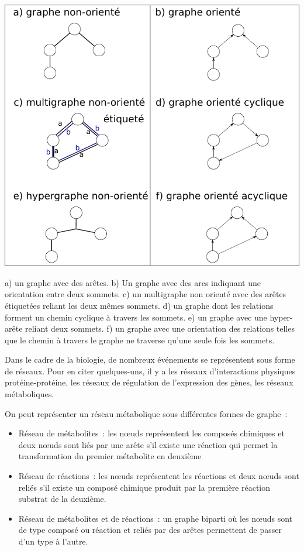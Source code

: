 \begin{refsegment}
    
    \begin{shadedfigure}[H]
    	\centering
    	\includegraphics[width=\textwidth]{img/graph.pdf}
    	\caption{a) un graphe  avec des arêtes. b) Un graphe avec des arcs indiquant une orientation entre deux sommets. c) un multigraphe non orienté avec des arêtes étiquetées reliant les deux mêmes sommets. d) un graphe dont les relations forment un chemin cyclique à travers les sommets. e) un graphe avec une hyper-arête reliant deux sommets. f) un graphe avec une orientation des relations telles que le chemin à travers le graphe ne traverse qu'une seule fois les sommets. }
    	\label{fig:graphe}
    \end{shadedfigure}
    
    
    
    Dans le cadre de la biologie, de nombreux événements se représentent sous forme de réseaux. Pour en citer quelques-uns, il y a les réseaux d'interactions physiques protéine-protéine, les réseaux de régulation de l'expression des gènes, les réseaux  métaboliques. 
    
    On peut représenter un réseau métabolique sous différentes formes de graphe :
    \begin{itemize}
    	\item Réseau de métabolites : les nœuds représentent les composés chimiques et deux nœuds sont liés par une arête s'il existe une réaction qui permet la transformation du premier métabolite en deuxième
    	\item Réseau de réactions : les nœuds représentent les réactions et deux nœuds sont reliés s'il existe un composé chimique produit par la première réaction substrat de la deuxième.
    	\item Réseau de métabolites et de réactions : un graphe biparti où les nœuds sont de type composé ou réaction et reliés par des arêtes permettent de passer d'un type à l'autre.
    	

\end{itemize}
\end{refsegment}
